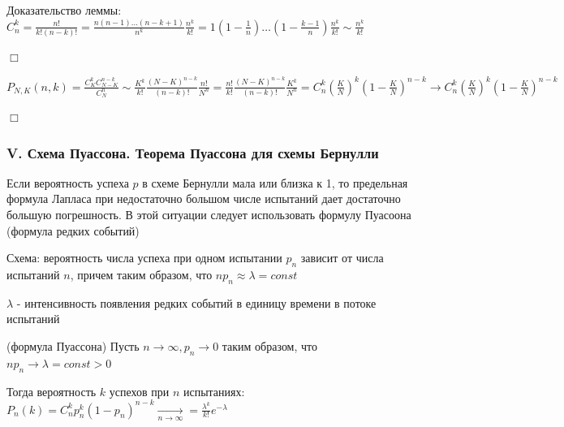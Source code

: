 \documentclass[12pt]{article}
\begin{document}
    Доказательство леммы: $C_n^k = \frac{n!}{k!(n - k)!} = \frac{n(n - 1) \dots (n - k + 1)}{n^k} \frac{n^k}{k!} = 1 \left(1 - \frac{1}{n}\right) \dots \left(1 - \frac{k - 1}{n}\right) \frac{n^k}{k!} \sim \frac{n^k}{k!}$

    \begin{MyProof}
        $\Box$

        $P_{N,K} (n, k) = \frac{C^k_K C_{N - K}^{n - k}}{C^n_N} \sim \frac{K^k}{k!} \frac{(N - K)^{n - k}}{(n - k)!} \frac{n!}{N^n} =
        \frac{n!}{k!} \frac{(N - K)^{n - k}}{(n - k)!} \frac{K^k}{N^n} = C^k_n \left(\frac{K}{N}\right)^k \left(1 - \frac{K}{N}\right)^{n - k} \to C^k_n \left(\frac{K}{N}\right)^k \left(1 - \frac{K}{N}\right)^{n - k} $

        $\Box$
    \end{MyProof}

    \hypertarget{poissonschema}{}

    \subsubsection{V. Схема Пуассона. Теорема Пуассона для схемы Бернулли}

    \Nota Если вероятность успеха $p$ в схеме Бернулли мала или близка к 1, то предельная формула Лапласа при недостаточно большом
    числе испытаний дает достаточно большую погрешность. В этой ситуации следует использовать формулу Пуасоона (формула редких событий)

    Схема: вероятность числа успеха при одном испытании $p_n$ зависит от числа испытаний $n$, причем таким образом, что $n p_n \approx \lambda = const$

    $\lambda$ - интенсивность появления редких событий в единицу времени в потоке испытаний

    \begin{MyTheorem}
         (формула Пуассона) Пусть $n \to \infty, p_n \to 0$ таким образом, что $n p_n \to \lambda = const > 0$

        Тогда вероятность $k$ успехов при $n$ испытаниях: $P_n(k) = C^k_n p_n^k (1 - p_n)^{n - k} \underset{n \to \infty}{\rightarrow} = \frac{\lambda^k}{k!} e^{-\lambda}$
    \end{MyTheorem}
\end{document}
